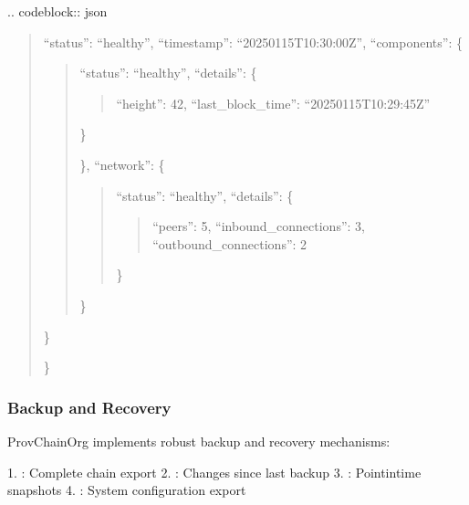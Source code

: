\documentclass[letterpaper,10pt,english]{sphinxmanual}
\begin{document}
\sphinxAtStartPar
{}
.. code\sphinxhyphen{}block:: json
\begin{quote}
\begin{description}
\sphinxlineitem{\{}
\sphinxAtStartPar
“status”: “healthy”,
“timestamp”: “2025\sphinxhyphen{}01\sphinxhyphen{}15T10:30:00Z”,
“components”: \{
\begin{quote}
\begin{description}
\sphinxAtStartPar
“status”: “healthy”,
“details”: \{
\begin{quote}

\sphinxAtStartPar
“height”: 42,
“last\_block\_time”: “2025\sphinxhyphen{}01\sphinxhyphen{}15T10:29:45Z”
\end{quote}

\sphinxAtStartPar
\}

\end{description}

\sphinxAtStartPar
\},
“network”: \{
\begin{quote}

\sphinxAtStartPar
“status”: “healthy”,
“details”: \{
\begin{quote}

\sphinxAtStartPar
“peers”: 5,
“inbound\_connections”: 3,
“outbound\_connections”: 2
\end{quote}

\sphinxAtStartPar
\}
\end{quote}

\sphinxAtStartPar
\}
\end{quote}

\sphinxAtStartPar
\}

\end{description}

\sphinxAtStartPar
\}
\end{quote}


\subsubsection{Backup and Recovery}
\label{\detokenize{research/technical-specifications:backup-and-recovery}}
\sphinxAtStartPar
ProvChainOrg implements robust backup and recovery mechanisms:

\sphinxAtStartPar
{}
1. : Complete chain export
2. : Changes since last backup
3. : Point\sphinxhyphen{}in\sphinxhyphen{}time snapshots
4. : System configuration export
\end{document}
